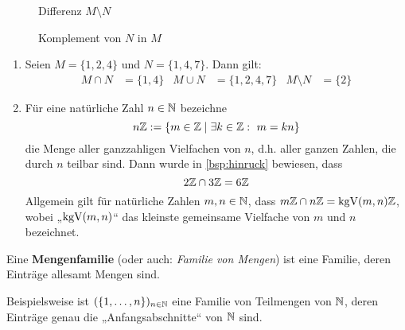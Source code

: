 \begin{defin}
\begin{figure}[ht]
\begin{minipage}{.48\textwidth}
\begin{tikzpicture}[scale=.75]
            \end{tikzpicture}
            \caption{Differenz $M\setminus N$}
        \end{minipage}
        \quad
        \begin{minipage}{.48\textwidth}
            \centering
            \caption{Komplement von $N$ in $M$}
        \end{minipage}
    \end{figure}
\end{defin}


\begin{bsp} \quad
    \begin{enumerate}
        \item Seien $ M = \{1, 2, 4\}$ und $N = \{1, 4, 7\}$. Dann gilt: 
	\begin{align*}
            M \cap N &= \{1, 4\} & M \cup N &= \{1, 2, 4, 7\} & M \setminus N &= \{2\}
	\end{align*}
        \item Für eine natürliche Zahl $n\in \N$ bezeichne
            \[ n\Z := \{ m\in \Z \mid \exists k\in \Z:\ m=kn \} \]
        die Menge aller ganzzahligen Vielfachen von $n$, d.h. aller ganzen Zahlen, die durch $n$ teilbar sind. Dann wurde in \cref{bsp:hinruck} bewiesen, dass
            \[ 2\Z \cap 3\Z = 6\Z \]
        Allgemein gilt für natürliche Zahlen $m,n\in \N$, dass $m\Z\cap n\Z = \kgV(m,n)\Z$, wobei „$\kgV(m,n)$“ das kleinste gemeinsame Vielfache von $m$ und $n$ bezeichnet.
    \end{enumerate}
\end{bsp}


\begin{defin}[Mengenfamilie] 
    Eine \textbf{Mengenfamilie} (oder auch: \emph{Familie von Mengen}) ist eine Familie, deren Einträge allesamt Mengen sind.
\end{defin}


\begin{bsp}
    Beispielsweise ist $(\{1,\dots , n\})_{n\in \N}$ eine Familie von Teilmengen von $\N$, deren Einträge genau die „Anfangsabschnitte“ von $\N$ sind.
\end{bsp}


